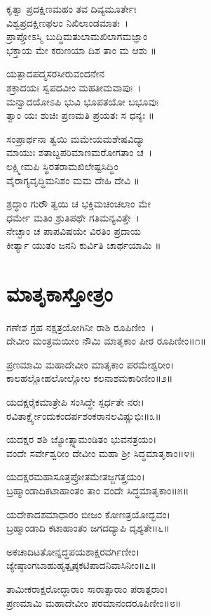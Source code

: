 ಕೃತ್ವಾ ಪ್ರದಕ್ಷಿಣಮಹಂ ತವ ದಿವ್ಯಮೂರ್ತೇಃ\\ವಿಶ್ವಪ್ರದಕ್ಷಿಣಫಲಂ ನಿಖಿಲಾಂಡಮಾತಃ~।\\
ಪ್ರಾಪ್ತೋಽಸ್ಮಿ ಬುದ್ಧಿಮತುಲಾಮಖಿಲಾಗಮಜ್ಞಾಂ \\ಭಕ್ತಾಯ ಮೇ ಕರುಣಯಾ ದಿಶ ತಾಂ ಮ ಆಶು ॥

ಯತ್ಪಾದಪದ್ಮಸರಸೀರುವಂದನೇನ \\ಶಕ್ರಾದಯಃ ಸ್ವಪದವೀಂ ಮಹತೀಮವಾಪುಃ~।\\
ಮನ್ವಾದಯೋಽಪಿ ಭುವಿ ಭೂಪತಯೋ ಬಭೂವುಃ\\ತ್ವಾಂ ಯಃ ಶುಚಿಃ ಪ್ರಣಮತಿ ಪ್ರಯತಃ ಸ ಧನ್ಯಃ ॥

ಸಂಪ್ರಾರ್ಥನಾ ತ್ವಯಿ ಮಮೇಯಮಶೇಷವಿದ್ಯಾ\-\\ಮಾಯುಃ ಶತಾಬ್ದಪರಿಮಾಣಮರೋಗತಾಂ ಚ~।\\
ಲಕ್ಷ್ಮೀಮಪಿ ಸ್ಥಿರತರಾಮಖಿಲೇಷ್ಟಸಿದ್ಧಿಂ \\ವೈರಾಗ್ಯವೃದ್ಧಿಮನಿಶಂ ಮಮ ದೇಹಿ ದೇವಿ ॥

ಶ್ರದ್ಧಾಂ ಗುರೌ ತ್ವಯಿ ಚ ಭಕ್ತಿಮಚಂಚಲಾಂ ಮೇ \\ಧರ್ಮೇ ಮತಿಂ ಶ್ರುತಿಪಥೇ ಗತಿಮನ್ಯವಿತ್ತೇ~।\\
ನೇಚ್ಛಾಂ ಚ ಪಾಪವಿಷಯೇ ವಿರತಿಂ ಪ್ರದಾಯ \\ಕೀರ್ತ್ಯಾ ಯುತಂ ಜನನಿ ಕುರ್ವಿತಿ ಚಾರ್ಥಯಾಮಿ ॥
\section{ಮಾತೃಕಾಸ್ತೋತ್ರಂ}
ಗಣೇಶ ಗ್ರಹ ನಕ್ಷತ್ರಯೋಗಿನೀ ರಾಶಿ ರೂಪಿಣೀಂ~।\\
ದೇವೀಂ ಮಂತ್ರಮಯೀಂ ನೌಮಿ ಮಾತೃಕಾಂ ಪೀಠ ರೂಪಿಣೀಂ॥೧॥

ಪ್ರಣಮಾಮಿ ಮಹಾದೇವೀಂ ಮಾತೃಕಾಂ ಪರಮೇಶ್ವರೀಂ।\\
ಕಾಲಹಲ್ಲೋಹಲೋಲ್ಲೋಲ ಕಲನಾಶಮಕಾರಿಣೀಂ॥೨॥

ಯದಕ್ಷರೈಕಮಾತ್ರೇಪಿ ಸಂಸಿದ್ಧೇ ಸ್ಪರ್ಧತೇ ನರಃ।\\
ರವಿತಾರ್ಕ್ಷ್ಯೇಂದುಕಂದರ್ಪಶಂಕರಾನಲವಿಷ್ಣುಭಿಃ॥೩॥

ಯದಕ್ಷರ ಶಶಿ ಜ್ಯೋತ್ಸ್ನಾಮಂಡಿತಂ ಭುವನತ್ರಯಂ।\\
ವಂದೇ ಸರ್ವೇಶ್ವರೀಂ ದೇವೀಂ ಮಹಾ ಶ್ರೀ ಸಿದ್ಧಮಾತೃಕಾಂ॥೪॥

ಯದಕ್ಷರಮಹಾಸೂತ್ರಪ್ರೋತಮೇತಜ್ಜಗತ್ತ್ರಯಂ।\\
ಬ್ರಹ್ಮಾಂಡಾದಿಕಟಾಹಾಂತಂ ತಾಂ ವಂದೇ ಸಿದ್ಧಮಾತೃಕಾಂ॥೫॥

ಯದೇಕಾದಶಮಾಧಾರಂ ಬೀಜಂ ಕೋಣತ್ರಯೋದ್ಭವಂ।\\
ಬ್ರಹ್ಮಾಂಡಾದಿ ಕಟಾಹಾಂತಂ ಜಗದದ್ಯಾಪಿ ದೃಶ್ಯತೇ॥೬॥

ಅಕಚಾದಿಟತೋನ್ನದ್ಧಪಯಶಾಕ್ಷರವರ್ಗಿಣೀಂ।\\
ಜ್ಯೇಷ್ಠಾಂಗಬಾಹುಹೃತ್ಪೃಷ್ಠಕಟಿಪಾದನಿವಾಸಿನೀಂ॥೭॥

ತಾಮೀಕರಾಕ್ಷರೋದ್ಧಾರಾಂ ಸಾರಾತ್ಸಾರಾಂ ಪರಾತ್ಪರಾಂ।\\
ಪ್ರಣಮಾಮಿ ಮಹಾದೇವೀಂ ಪರಮಾನಂದರೂಪಿಣೀಂ॥೮॥

